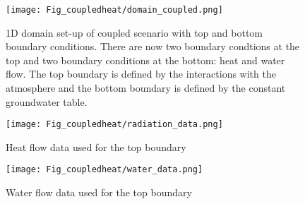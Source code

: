 \begin{table}[!h]
\centering
\caption{\label{tab_coup1}Material properties needed for scenarios.}
\end{table}


\begin{figure}[!h]
\centering
\texttt{[image: Fig\_coupledheat/domain\_coupled.png]}
\caption{1D domain set-up of coupled scenario with top and bottom boundary conditions. There are now two boundary condtions at the top and two boundary conditions at the bottom: heat and water flow. The top boundary is defined by the interactions with the atmosphere and the bottom boundary is defined by the constant groundwater table.}
\end{figure}


\begin{figure}[!h]
\centering
\texttt{[image: Fig\_coupledheat/radiation\_data.png]}
\caption{Heat flow data used for the top boundary}
\end{figure}

\begin{figure}[!h]
\centering
\texttt{[image: Fig\_coupledheat/water\_data.png]}
\caption{Water flow data used for the top boundary}
\end{figure}
\newpage

